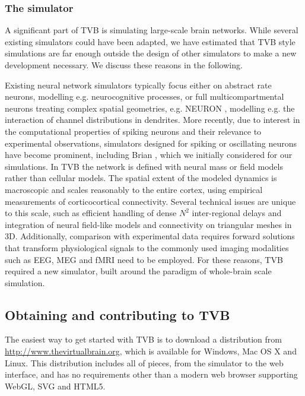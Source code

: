\subsubsection{The simulator}

A significant part of TVB is simulating large-scale brain networks. While
several existing simulators could have been adapted, we have estimated that
TVB style simulations are far enough outside the design of other simulators to
make a new development necessary. We discuss these reasons in the following. 

Existing neural network simulators typically focus either on abstract rate neurons, 
modelling e.g. neurocognitive processes, or 
full multicompartmental neurons treating complex spatial
geometries, e.g. NEURON \cite{Hines_2001}, modelling e.g. the interaction of 
channel distributions in dendrites.  More recently, due to interest in
the computational properties of spiking neurons and their relevance to
experimental observations, simulators designed for spiking or oscillating neurons
have become prominent, including Brian \cite{Goodman_2009}, which we initially 
considered for our simulations.
In TVB the network is defined with neural mass or field
models \cite{Deco_2008a, Coombes_2010} rather than cellular models. The
spatial extent of the modeled dynamics is macroscopic and scales reasonably 
to the entire cortex, using empirical measurements of corticocortical
connectivity. Several technical issues are unique to this scale, such
as efficient handling of dense $N^2$ inter-regional delays and integration
of neural field-like models and connectivity on triangular meshes in 3D.
Additionally, comparison with experimental data requires forward solutions
that transform physiological signals to the commonly
used imaging modalities such as EEG, MEG and fMRI need to be employed.
For these reasons, TVB required a new simulator, built around the paradigm
of whole-brain scale simulation.

\subsection{Obtaining and contributing to TVB}

The easiest way to get started with TVB is to download a distribution
from \url{http://www.thevirtualbrain.org}, which is available for Windows,
Mac OS X and Linux. This distribution includes
all of pieces, from the simulator to the web interface, and has no
requirements other than a modern web browser supporting WebGL, SVG and
HTML5.

